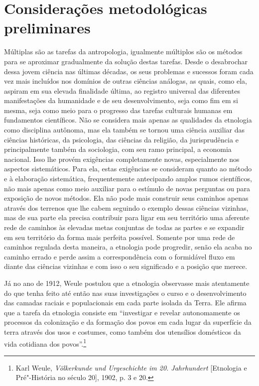 \chapter{Considerações metodológicas preliminares}

Múltiplas são as tarefas da antropologia, igualmente múltiplos são os
métodos para se aproximar gradualmente da solução destas tarefas. Desde
o desabrochar dessa jovem ciência nas últimas décadas, os seus problemas
e sucessos foram cada vez mais incluídos nos domínios de outras ciências
análogas, as quais, como ela, aspiram em sua elevada finalidade última,
ao registro universal das diferentes manifestações da humanidade e de
seu desenvolvimento, seja como fim em si mesma, seja como meio para o
progresso das tarefas culturais humanas em fundamentos científicos. Não
se considera mais apenas as qualidades da etnologia como disciplina
autônoma, mas ela também se tornou uma ciência auxiliar das ciências
históricas, da psicologia, das ciências da religião, da jurisprudência
e principalmente também da sociologia, com seu ramo principal, a
economia nacional. Isso lhe provém exigências completamente novas,
especialmente nos aspectos sistemáticos. Para ela, estas exigências se
consideram quanto ao método e à elaboração sistemática, frequentemente
antecipando amplos rumos científicos, não mais apenas como meio
auxiliar para o estímulo de novas perguntas ou para exposição de novos
métodos. Ela não pode mais construir seus caminhos apenas através dos
terrenos que lhe cabem seguindo o exemplo dessas ciências vizinhas, mas
de sua parte ela precisa contribuir para ligar em seu território uma
aferente rede de caminhos às elevadas metas conjuntas de todas as
partes e se expandir em seu território da forma mais perfeita possível.
Somente por uma rede de caminhos regulada desta maneira, a etnologia
pode progredir, senão ela acaba no caminho errado e perde assim a
correspondência com o formidável fluxo em diante das ciências vizinhas e
com isso o seu significado e a posição que merece.

Já no ano de 1912, Weule postulou que a etnologia observasse mais
atentamente do que tenha feito até então nas suas investigações o curso
e o desenvolvimento das camadas raciais e populacionais em cada parte
isolada da Terra. Ele afirma que a tarefa da etnologia consiste em
``investigar e revelar autonomamente os processos da colonização e da
formação dos povos em cada lugar da superfície da terra através dos usos
e costumes, como também dos utensílios domésticos da vida cotidiana dos
povos''.\footnote{Karl Weule, \emph{Völkerkunde und Urgeschichte im 20.
  Jahrhundert} {[}Etnologia e Pré"-História no século 20{]}, 1902, p. 3 e
  20.}

